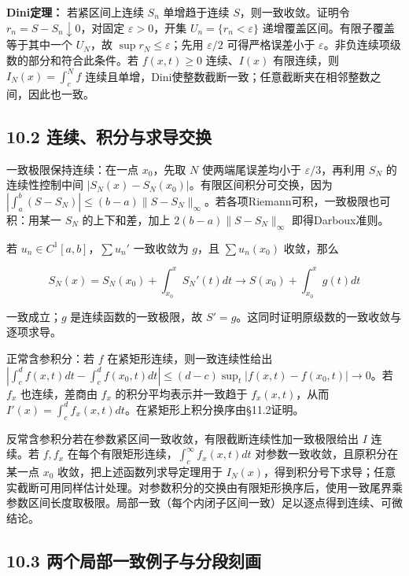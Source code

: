 \documentclass[11pt,a4paper]{article}
\begin{document}
\textbf{Dini定理：} 若紧区间上连续 \(S_n\) 单增趋于连续
\(S\)，则一致收敛。证明令 \(r_n=S-S_n\downarrow0\)，对固定
\(\varepsilon>0\)，开集 \(U_n=\{r_n<\varepsilon\}\)
递增覆盖区间。有限子覆盖等于其中一个 \(U_N\)，故
\(\sup r_N\le\varepsilon\)；先用 \(\varepsilon/2\) 可得严格误差小于
\(\varepsilon\)。非负连续项级数的部分和符合此条件。若 \(f(x,t)\ge0\)
连续、\(I(x)\) 有限连续，则 \(I_N(x)=\int_c^Nf\)
连续且单增，Dini使整数截断一致；任意截断夹在相邻整数之间，因此也一致。

\subsection{10.2
连续、积分与求导交换}\label{ux8fdeux7eedux79efux5206ux4e0eux6c42ux5bfcux4ea4ux6362}

一致极限保持连续：在一点 \(x_0\)，先取 \(N\) 使两端尾误差均小于
\(\varepsilon/3\)，再利用 \(S_N\) 的连续性控制中间
\(|S_N(x)-S_N(x_0)|\)。有限区间积分可交换，因为
\(|\int_a^b(S-S_N)|\le(b-a)\|S-S_N\|_\infty\)。若各项Riemann可积，一致极限也可积：用某一
\(S_N\) 的上下和差，加上 \(2(b-a)\|S-S_N\|_\infty\) 即得Darboux准则。

若 \(u_n\in C^1[a,b]\)，\(\sum u_n'\) 一致收敛为 \(g\)，且
\(\sum u_n(x_0)\) 收敛，那么

\[
S_N(x)=S_N(x_0)+\int_{x_0}^xS_N'(t)dt
\longrightarrow S(x_0)+\int_{x_0}^xg(t)dt
\]

一致成立；\(g\) 是连续函数的一致极限，故
\(S'=g\)。这同时证明原级数的一致收敛与逐项求导。

正常含参积分：若 \(f\) 在紧矩形连续，则一致连续性给出
\(|\int_c^df(x,t)dt-\int_c^df(x_0,t)dt|\le(d-c)\sup_t|f(x,t)-f(x_0,t)|\to0\)。若
\(f_x\) 也连续，差商由 \(f_x\) 的积分平均表示并一致趋于
\(f_x(x,t)\)，从而
\(I'(x)=\int_c^df_x(x,t)dt\)。在紧矩形上积分换序由§11.2证明。

反常含参积分若在参数紧区间一致收敛，有限截断连续性加一致极限给出 \(I\)
连续。若 \(f,f_x\) 在每个有限矩形连续，\(\int_c^\infty f_x(x,t)dt\)
对参数一致收敛，且原积分在某一点 \(x_0\) 收敛，把上述函数列求导定理用于
\(I_N(x)\)，得到积分号下求导；任意实截断可用同样估计处理。对参数积分的交换由有限矩形换序后，使用一致尾界乘参数区间长度取极限。局部一致（每个内闭子区间一致）足以逐点得到连续、可微结论。

\subsection{10.3
两个局部一致例子与分段刻画}\label{ux4e24ux4e2aux5c40ux90e8ux4e00ux81f4ux4f8bux5b50ux4e0eux5206ux6bb5ux523bux753b}
\end{document}

